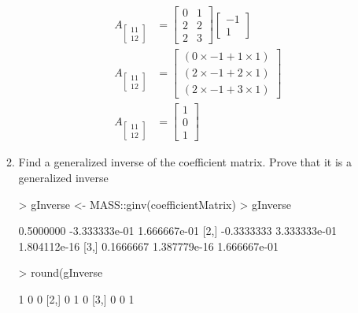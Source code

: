 \documentclass[12pt,a4paper]{paper}
\begin{document}
\begin{enumerate}
\begin{enumerate}
\begin{equation}
\begin{split}
A_{\left[\begin{array}{c}11\\12\end{array}\right]}&= \left[\begin{array}{cc}0&1\\2&2\\2&3\end{array}\right]\left[\begin{array}{c}-1\\1\end{array}\right]\\
A_{\left[\begin{array}{c}11\\12\end{array}\right]}&= \left[\begin{array}{c}(0 \times -1 + 1 \times 1)\\(2 \times -1 + 2 \times 1)\\(2 \times -1 + 3 \times 1)\end{array}\right]\\
A_{\left[\begin{array}{c}11\\12\end{array}\right]}&= \left[\begin{array}{c}1\\0\\1\end{array}\right]
\end{split}
\end{equation}
\item Find a generalized inverse of the coefficient matrix. Prove that it is a generalized inverse
\begin{Schunk}
\begin{Sinput}
> gInverse <- MASS::ginv(coefficientMatrix)
> gInverse
\end{Sinput}
\begin{Soutput}
           [,1]          [,2]         [,3]
[1,]  0.5000000 -3.333333e-01 1.666667e-01
[2,] -0.3333333  3.333333e-01 1.804112e-16
[3,]  0.1666667  1.387779e-16 1.666667e-01
\end{Soutput}
\begin{Sinput}
> round(gInverse %*% coefficientMatrix)
\end{Sinput}
\begin{Soutput}
     [,1] [,2] [,3]
[1,]    1    0    0
[2,]    0    1    0
[3,]    0    0    1
\end{Soutput}
\begin{Sinput}

\end{Sinput}
\end{Schunk}
\end{enumerate}
\end{enumerate}
\end{document}
